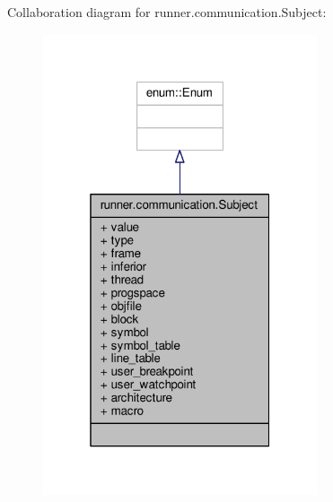 Collaboration diagram for runner.\+communication.\+Subject\+:
\nopagebreak
\begin{figure}[H]
\begin{center}
\leavevmode
\includegraphics[width=229pt]{classrunner_1_1communication_1_1Subject__coll__graph}
\end{center}
\end{figure}
